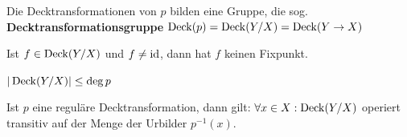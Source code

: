 \begin{bemerkung}%
    \begin{bemenum}
        \item Die Decktransformationen von $p$ bilden eine Gruppe, 
              die sog. \textbf{Decktransformationsgruppe}
              $\operatorname{Deck}(p) = \operatorname{Deck}(Y/X) = \operatorname{Deck}(Y \rightarrow X)$
        \item Ist $f \in \operatorname{Deck}(Y/X)$ und $f \neq \textnormal{id}$, dann hat
              $f$ keinen Fixpunkt.
        \item $|\operatorname{Deck}(Y/X)| \leq \deg{p}$\label{kor:12.14c}
        \item Ist $p$ eine reguläre Decktransformation, dann gilt:
              $\forall x \in X: \operatorname{Deck}(Y/X)$ operiert transitiv
              auf der Menge der Urbilder $p^{-1}(x)$.
    \end{bemenum}
\end{bemerkung}

